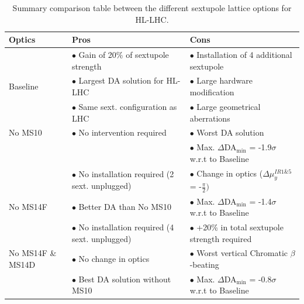 \documentclass{cernatsnote}
\begin{document}
\begin{landscape}
\begin{table}[h!]
\begin{center}
\caption{\label{tab_circuit_ms10} Summary comparison table between the different sextupole lattice options for HL-LHC.}
\begin{tabular}{|l|l|l|} \hline
Optics   &  Pros  &  Cons\\\hline

         &    $\bullet$ Gain of 20\% of sextupole strength    &  $\bullet$ Installation of 4 additional sextupole \\
Baseline &    $\bullet$ Largest DA solution for HL-LHC        &  $\bullet$ Large hardware modification\\\hline

         &    $\bullet$ Same sext. configuration as LHC    &   $\bullet$ Large geometrical aberrations\\
No MS10  &    $\bullet$ No intervention required           &   $\bullet$ Worst DA solution\\
         &                                                 &   $\bullet$ Max. $\Delta$DA$_{\mathrm{min}}$ = -1.9$\sigma$ w.r.t to Baseline\\\hline


          &    $\bullet$ No installation required (2 sext. unplugged)   &   $\bullet$ Change in optics ($\Delta\mu_{y}^{IR1\&5}$ = -$\frac{\pi}{2})$\\
No MS14F  &    $\bullet$ Better DA than No MS10                &   $\bullet$ Max. $\Delta$DA$_{\mathrm{min}}$ = -1.4$\sigma$ w.r.t to Baseline \\\hline

          &    $\bullet$ No installation required (4 sext. unplugged)   &   $\bullet$ +20\% in total sextupole strength required\\
No MS14F \& MS14D   &    $\bullet$ No change in optics                   &   $\bullet$ Worst vertical Chromatic $\beta$-beating \\
          &    $\bullet$ Best DA solution without MS10         &   $\bullet$ Max. $\Delta$DA$_{\mathrm{min}}$ = -0.8$\sigma$ w.r.t to Baseline \\ \hline

\end{tabular}
\end{center}
\end{table}
\end{landscape}
\end{document}
